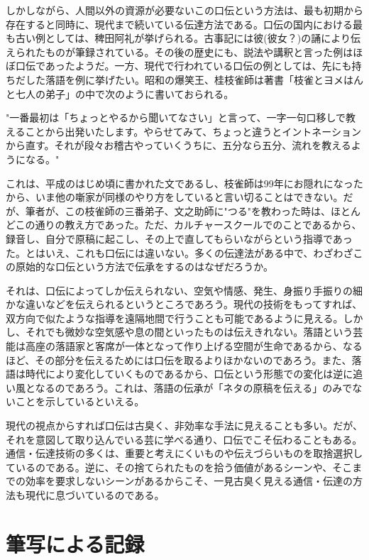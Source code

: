 しかしながら、人間以外の資源が必要ないこの口伝という方法は、最も初期から存在すると同時に、現代まで続いている伝達方法である。口伝の国内における最も古い例としては、稗田阿礼が挙げられる。古事記には彼(彼女？)の誦により伝えられたものが筆録されている。その後の歴史にも、説法や講釈と言った例はほぼ口伝であったようだ。一方、現代で行われている口伝の例としては、先にも持ちだした落語を例に挙げたい。昭和の爆笑王、桂枝雀師は著書「枝雀とヨメはんと七人の弟子」の中で次のように書いておられる。

"一番最初は「ちょっとやるから聞いてなさい」と言って、一字一句口移しで教えることから出発いたします。やらせてみて、ちょっと違うとイントネーションから直す。それが段々お稽古やっていくうちに、五分なら五分、流れを教えるようになる。"

これは、平成のはじめ頃に書かれた文であるし、枝雀師は99年にお隠れになったから、いま他の噺家が同様のやり方をしていると言い切ることはできない。だが、筆者が、この枝雀師の三番弟子、文之助師に"つる"を教わった時は、ほとんどこの通りの教え方であった。ただ、カルチャースクールでのことであるから、録音し、自分で原稿に起こし、その上で直してもらいながらという指導であった。とはいえ、これも口伝には違いない。多くの伝達法がある中で、わざわざこの原始的な口伝という方法で伝承をするのはなぜだろうか。

それは、口伝によってしか伝えられない、空気や情感、発生、身振り手振りの細かな違いなどを伝えられるというところであろう。現代の技術をもってすれば、双方向で似たような指導を遠隔地間で行うことも可能であるように見える。しかし、それでも微妙な空気感や息の間といったものは伝えきれない。落語という芸能は高座の落語家と客席が一体となって作り上げる空間が生命であるから、なるほど、その部分を伝えるためには口伝を取るよりほかないのであろう。また、落語は時代により変化していくものであるから、口伝という形態での変化は逆に追い風となるのであろう。これは、落語の伝承が「ネタの原稿を伝える」のみでないことを示しているといえる。

現代の視点からすれば口伝は古臭く、非効率な手法に見えることも多い。だが、それを意図して取り込んでいる芸に学べる通り、口伝でこそ伝わることもある。通信・伝達技術の多くは、重要と考えにくいものや伝えづらいものを取捨選択しているのである。逆に、その捨てられたものを拾う価値があるシーンや、そこまでの効率を要求しないシーンがあるからこそ、一見古臭く見える通信・伝達の方法も現代に息づいているのである。


\section{筆写による記録}

